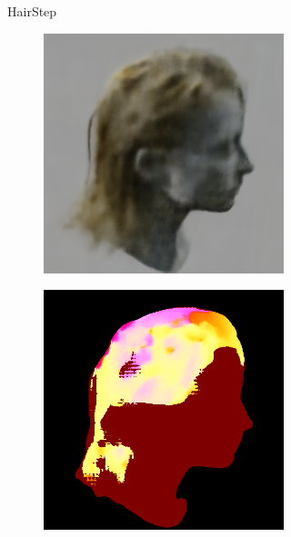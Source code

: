 \documentclass{article}
\begin{document}
\begin{figure}[h]
\begin{subfigure}{0.22\textwidth}
\begin{subfigure}{0.48\textwidth}
        \end{subfigure}
        \caption{HairStep}
    \end{subfigure}
    \hfill
    \begin{subfigure}{0.22\textwidth}
        \begin{subfigure}{0.48\textwidth}
            \centering
            \includegraphics[width=\textwidth]{./images/baseline-method/pred_6_nerf.png}
        \end{subfigure}
        \hfill
        \begin{subfigure}{0.48\textwidth}
            \centering
            \includegraphics[width=\textwidth]{./images/baseline-method/pred_6_hairstep.png}

\end{subfigure}
\end{subfigure}
\end{figure}
\end{document}
